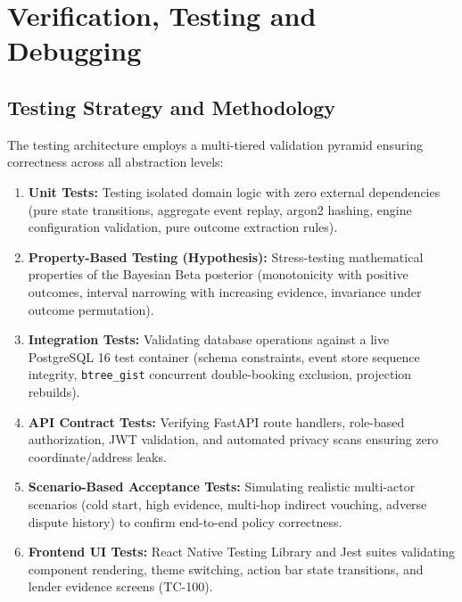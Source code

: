 \chapter{Verification, Testing and Debugging}

\section{Testing Strategy and Methodology}
The testing architecture employs a multi-tiered validation pyramid ensuring correctness across all abstraction levels:
\begin{enumerate}
    \item \textbf{Unit Tests:} Testing isolated domain logic with zero external dependencies (pure state transitions, aggregate event replay, argon2 hashing, engine configuration validation, pure outcome extraction rules).
    \item \textbf{Property-Based Testing (Hypothesis):} Stress-testing mathematical properties of the Bayesian Beta posterior (monotonicity with positive outcomes, interval narrowing with increasing evidence, invariance under outcome permutation).
    \item \textbf{Integration Tests:} Validating database operations against a live PostgreSQL 16 test container (schema constraints, event store sequence integrity, \texttt{btree\_gist} concurrent double-booking exclusion, projection rebuilds).
    \item \textbf{API Contract Tests:} Verifying FastAPI route handlers, role-based authorization, JWT validation, and automated privacy scans ensuring zero coordinate/address leaks.
    \item \textbf{Scenario-Based Acceptance Tests:} Simulating realistic multi-actor scenarios (cold start, high evidence, multi-hop indirect vouching, adverse dispute history) to confirm end-to-end policy correctness.
    \item \textbf{Frontend UI Tests:} React Native Testing Library and Jest suites validating component rendering, theme switching, action bar state transitions, and lender evidence screens (TC-100).
\end{enumerate}

